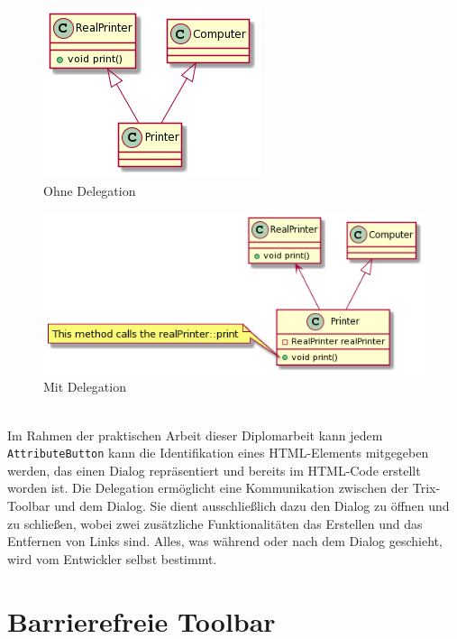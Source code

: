 \begin{figure}[H]
\begin{center}
	\includegraphics[scale=.7]{images/delegation-1.png}
\end{center}
	\caption{Ohne Delegation} 
\end{figure}

\begin{figure}[H]
\begin{center}
	\includegraphics[scale=.7]{images/delegation-2.png}
\end{center}
	\caption{Mit Delegation} 
\end{figure}

\mbox{}\\
Im Rahmen der praktischen Arbeit dieser Diplomarbeit kann jedem \texttt{AttributeButton} kann die Identifikation eines HTML-Elements mitgegeben werden, das einen Dialog repräsentiert und bereits im HTML-Code erstellt worden ist. Die Delegation ermöglicht eine Kommunikation zwischen der Trix-Toolbar und dem Dialog. Sie dient ausschließlich dazu den Dialog zu öffnen und zu schließen, wobei zwei zusätzliche Funktionalitäten das Erstellen und das Entfernen von Links sind. Alles, was während oder nach dem Dialog geschieht, wird vom Entwickler selbst bestimmt.

\section{Barrierefreie Toolbar}

